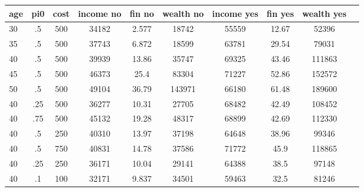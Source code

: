 \begin{table}[htbp]
\begin{tabular}{lccccccccc} \hline \hline
 \multicolumn{1}{c}{ age }  & pi0  & cost  & income no  & fin no  & wealth no  & income yes  & fin yes  & wealth yes  \\  \hline 
       30 &        .5 &       500 &     34182 &     2.577 &     18742 &     55559 &     12.67 &     52396 \\  
       35 &        .5 &       500 &     37743 &     6.872 &     18599 &     63781 &     29.54 &     79031 \\  
       40 &        .5 &       500 &     39939 &     13.86 &     35747 &     69325 &     43.46 &    111863 \\  
       45 &        .5 &       500 &     46373 &      25.4 &     83304 &     71227 &     52.86 &    152572 \\  
       50 &        .5 &       500 &     49104 &     36.79 &    143971 &     66180 &     61.48 &    189600 \\  
       40 &       .25 &       500 &     36277 &     10.31 &     27705 &     68482 &     42.49 &    108452 \\  
       40 &       .75 &       500 &     45132 &     19.28 &     48317 &     68899 &     42.69 &    112330 \\  
       40 &        .5 &       250 &     40310 &     13.97 &     37198 &     64648 &     38.96 &     99346 \\  
       40 &        .5 &       750 &     40831 &     14.78 &     37586 &     71772 &      45.9 &    118865 \\  
       40 &       .25 &       250 &     36171 &     10.04 &     29141 &     64388 &      38.5 &     97148 \\  
       40 &        .1 &       100 &     32171 &     9.837 &     34501 &     59463 &      32.5 &     81246 \\  
\hline \hline \end{tabular}
\end{table}
